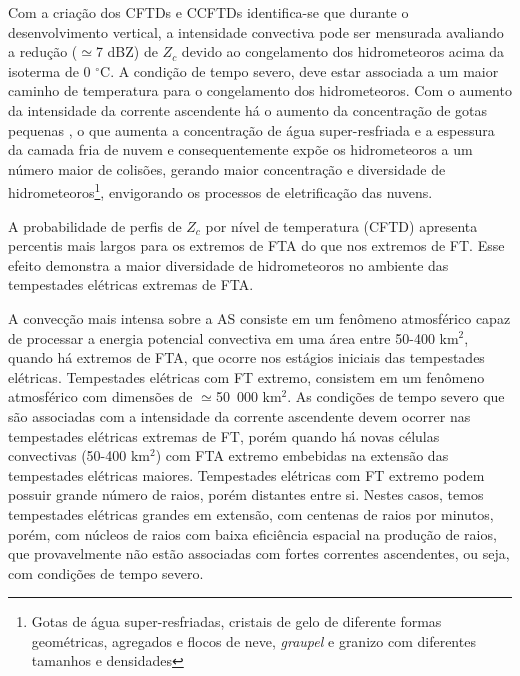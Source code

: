 Com a criação dos CFTDs e CCFTDs identifica-se que durante o desenvolvimento vertical, a intensidade convectiva pode ser mensurada avaliando a redução ($\simeq$7 dBZ) de $Z_c$ devido ao congelamento dos hidrometeoros acima da isoterma de 0 $^{\circ}$C. A condição de tempo severo, deve estar associada a um maior caminho de temperatura para o congelamento dos hidrometeoros. Com o aumento da intensidade da corrente ascendente há o aumento da concentração de gotas pequenas \cite{bigg1953}, o que aumenta a concentração de água super-resfriada e a espessura da camada fria de nuvem e consequentemente expõe os hidrometeoros a um número maior de colisões, gerando maior concentração e diversidade de hidrometeoros\footnote{Gotas de água super-resfriadas, cristais de gelo de diferente formas geométricas, agregados e flocos de neve, \textit{graupel} e granizo com diferentes tamanhos e densidades}, envigorando os processos de eletrificação das nuvens.  

A probabilidade de perfis de $Z_c$ por nível de temperatura (CFTD) apresenta percentis mais largos para os extremos de FTA do que nos extremos de FT. Esse efeito demonstra a maior diversidade de hidrometeoros no ambiente das tempestades elétricas extremas de FTA.    


A convecção mais intensa sobre a AS consiste em um fenômeno atmosférico capaz de processar a energia potencial convectiva em uma área entre 50-400 km$^{2}$, quando há extremos de FTA, que ocorre nos estágios iniciais das tempestades elétricas. Tempestades elétricas com FT extremo, consistem em um fenômeno  atmosférico com dimensões de $\simeq$50~000 km$^{2}$. As condições de tempo severo que são associadas com a intensidade da corrente ascendente devem ocorrer nas tempestades elétricas extremas de FT, porém quando há novas células convectivas (50-400 km$^{2}$) com FTA extremo embebidas na extensão das tempestades elétricas maiores. Tempestades elétricas com FT extremo podem possuir grande número de raios, porém distantes entre si. Nestes casos, temos tempestades elétricas grandes em extensão, com centenas de raios por minutos, porém,  com núcleos de raios com baixa eficiência espacial na produção de raios, que provavelmente não estão associadas com fortes correntes ascendentes, ou seja, com condições de tempo severo.


